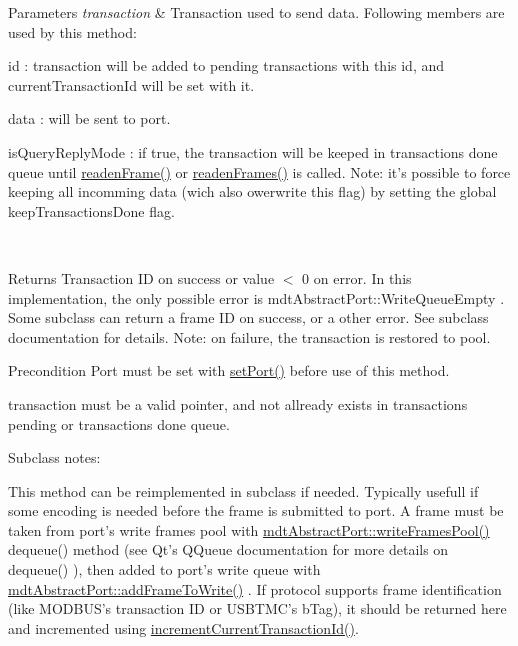 \begin{DoxyParams}{Parameters}
{\em transaction} & Transaction used to send data. Following members are used by this method:
\begin{DoxyItemize}
\item id : transaction will be added to pending transactions with this id, and currentTransactionId will be set with it.
\item data : will be sent to port.
\item isQueryReplyMode : if true, the transaction will be keeped in transactions done queue until \hyperlink{classmdt_port_manager_a830ae182d06dd6a52c43a7f45b9240ac}{readenFrame()} or \hyperlink{classmdt_port_manager_addd5dcae9644cea42a9871205af41796}{readenFrames()} is called. Note: it's possible to force keeping all incomming data (wich also owerwrite this flag) by setting the global keepTransactionsDone flag. 
\end{DoxyItemize}\\
\hline
\end{DoxyParams}
\begin{DoxyReturn}{Returns}
Transaction ID on success or value $<$ 0 on error. In this implementation, the only possible error is mdtAbstractPort::WriteQueueEmpty . Some subclass can return a frame ID on success, or a other error. See subclass documentation for details. Note: on failure, the transaction is restored to pool. 
\end{DoxyReturn}
\begin{DoxyPrecond}{Precondition}
Port must be set with \hyperlink{classmdt_port_manager_afcd156b2d0c9d340999935efb6cd8cb6}{setPort()} before use of this method. 

transaction must be a valid pointer, and not allready exists in transactions pending or transactions done queue.
\end{DoxyPrecond}
Subclass notes:\par
 This method can be reimplemented in subclass if needed. Typically usefull if some encoding is needed before the frame is submitted to port. A frame must be taken from port's write frames pool with \hyperlink{classmdt_abstract_port_abf093b67fddebffa4f3c52277b9a8cf7}{mdtAbstractPort::writeFramesPool()} dequeue() method (see Qt's QQueue documentation for more details on dequeue() ), then added to port's write queue with \hyperlink{classmdt_abstract_port_a9a69eb2fc07d551ab37c011487fa319d}{mdtAbstractPort::addFrameToWrite()} . If protocol supports frame identification (like MODBUS's transaction ID or USBTMC's bTag), it should be returned here and incremented using \hyperlink{classmdt_port_manager_a4d009936a0a5130f3bfecb69fee4ce42}{incrementCurrentTransactionId()}. 

